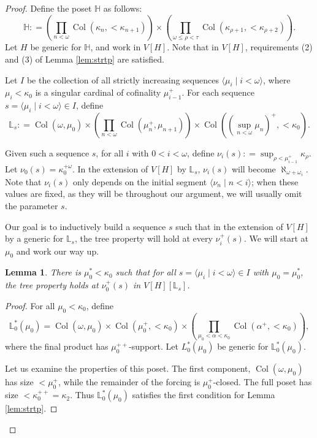 \documentclass[psamsfonts]{amsart}
\newtheorem{lemma}[thm]{Lemma}
\theoremstyle{definition}
\newcommand{\defeq}{\mathrel{\mathop:}=}
\newcommand{\LL}{\mathbb{L}}
\newcommand{\HH}{\mathbb{H}}
\newcommand{\ka}{\kappa}
\newcommand{\w}{\omega}
\DeclareMathOperator{\Coll}{Col}
\numberwithin{equation}{section}
\begin{document}
\begin{proof}
	Define the poset $\HH$ as follows:
	\[\HH\defeq \left(\prod_{n<\w} \Coll(\ka_n, <\ka_{n+1})\right) \times \left( \prod_{\w\leq\rho<\tau} \Coll(\ka_{\rho+1}, <\ka_{\rho+2})\right).\] Let $H$ be generic for $\HH$, and work in $V[H]$. Note that in $V[H]$, requirements (2) and (3) of Lemma \ref{lem:strtp} are satisfied.
	
	Let $I$ be the collection of all strictly increasing sequences $\langle \mu_i \mid i<\w\rangle$, where $\mu_i <\ka_0$ is a singular cardinal of cofinality $\mu_{i-1}^+$. For each sequence $s = \langle \mu_i \mid i<\w\rangle \in I$, define 
	\[\LL_s \defeq \Coll(\w, \mu_0) \times \left(\prod_{n<\w} \Coll(\mu_{n}^+, \mu_{n+1})\right)\times \Coll\left((\sup_{n<\w}\mu_n)^+, <\ka_0\right).\]
	
	Given such a sequence $s$, for all $i$ with $0<i<\w$, define $\nu_i(s) \defeq \sup_{\rho < \mu_{i-1}^+} \ka_\rho$. Let $\nu_0(s) = \ka_0^{+\w}$. In the extension of $V[H]$ by $\LL_s$, $\nu_i(s)$ will become $\aleph_{\w+\w_i}$. Note that $\nu_i(s)$ only depends on the initial segment $\langle \nu_n \mid n<i\rangle$; when these values are fixed, as they will be throughout our argument, we will usually omit the parameter $s$.
	
	Our goal is to inductively build a sequence $s$ such that in the extension of $V[H]$ by a generic for $\LL_s$, the tree property will hold at every $\nu_{i}^+(s)$. We will start at $\mu_0$ and work our way up.
	
	\begin{lemma}\label{lem:basetp}
		There is $\mu^*_0 < \ka_0$ such that for all $s = \langle \mu_i \mid i<\w\rangle \in I$ with $\mu_0 = \mu^*_0$, the tree property holds at $\nu_0^+(s)$ in $V[H][\LL_s]$.
	\end{lemma}
	\begin{proof}
	For all $\mu_0 < \ka_0$, define
	\[\LL_0^*(\mu_0) = \Coll(\w, \mu_0) \times \Coll(\mu_0^+, <\ka_0) \times  \left(\prod_{\mu_0 < \alpha < \ka_0} \Coll(\alpha^+, <\ka_0)\right),\]
	where the final product has $\mu_0^{++}$-support. 
	Let $L_0^*(\mu_0)$ be generic for $\LL_0^*(\mu_0)$. 

	
	Let us examine the properties of this poset. The first component, $\Coll(\w, \mu_0)$ has size $< \mu_0^+$, while the remainder of the forcing is $\mu_0^+$-closed. The full poset has size $<\ka_0^{++} = \ka_2$. Thus $\LL_0^*(\mu_0)$ satisfies the first condition for Lemma \ref{lem:strtp}.
	

\end{proof}
\end{proof}
\end{document}
